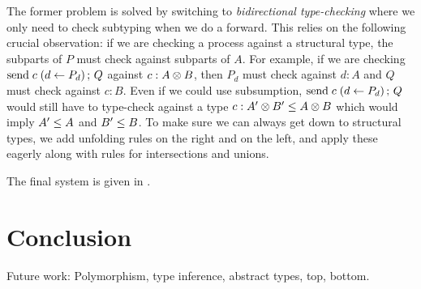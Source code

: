 \documentclass[a4paper,USenglish]{lipics-v2016}
\begin{document}
The former problem is solved by switching to \emph{bidirectional type-checking} where we only need to check subtyping when we do a forward. This relies on the following crucial observation: if we are checking a process against a structural type, the subparts of $P$ must check against subparts of $A$. For example, if we are checking $\mathrm{send}\; c \; (d \leftarrow P_d) \,;\, Q$ against $c : A \otimes B$, then $P_d$ must check against $d : A$ and $Q$ must check against $c : B$. Even if we could use subsumption, $\mathrm{send}\; c \; (d \leftarrow P_d) \,;\, Q$ would still have to type-check against a type $c : A' \otimes B' \le A \otimes B$ which would imply $A' \le A$ and $B' \le B$.  To make sure we can always get down to structural types, we add unfolding rules on the right and on the left, and apply these eagerly along with rules for intersections and unions.


The final system is given in .


\section{Conclusion}
\label{conclusion}

Future work:
Polymorphism, type inference, abstract types, top, bottom.


\appendix





\end{document}
